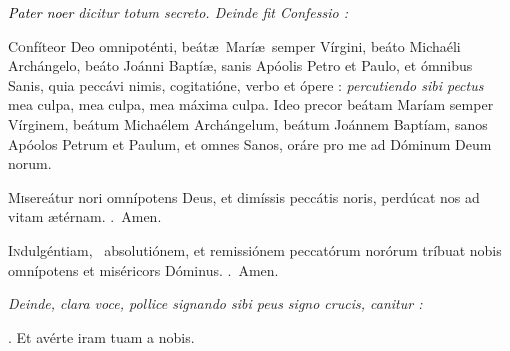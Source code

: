 \documentclass[12pt]{article} %
\def\noinitial{%
\setspaceafterinitial{0pt plus 0em minus 0em}%
\setspacebeforeinitial{0pt plus 0em minus 0em}%
\relax %
}
\newenvironment{rubric}{\color{benred8} \itshape \leftskip 0in \setlength{\parindent}{0.25in}}{\vspace{2 mm}}
\newenvironment{response}{\leftskip 0in \setlength{\parindent}{0in}}{\vspace{2 mm}}
\let\oldRbar\Rbar
\renewcommand{\Rbar}{\textcolor{benred8}{\oldRbar .}}
\let\oldgrealtcross\grealtcross
\renewcommand{\grealtcross}{\textcolor{benred8}{\oldgrealtcross}}
\begin{document}
\vspace{1.5mm}

\begin{rubric}
\emph{\textcolor{black}{Pater noer}} dicitur totum secreto. Deinde fit Confessio :

\end{rubric}

\begin{response}\lettrine{C}{o}nf\'{i}teor Deo omnipot\'{e}nti, be\'{a}t\ae\ Mar\'{i}\ae\ semper V\'{i}rgini, be\'{a}to Micha\'{e}li Arch\'{a}ngelo, be\'{a}to Jo\'{a}nni Bapt\'{i}\ae , sanis Ap\'{o}olis Petro et Paulo, et \'{o}mnibus Sanis, quia pecc\'{a}vi nimis, cogitati\'{o}ne, verbo et \'{o}pere : \emph{\textcolor{benred8}{percutiendo sibi pectus}} mea culpa, mea culpa, mea m\'{a}xima culpa. Ideo precor be\'{a}tam Mar\'{i}am semper V\'{i}rginem, be\'{a}tum Micha\'{e}lem Arch\'{a}ngelum, be\'{a}tum Jo\'{a}nnem Bapt\'{i}am, sanos Ap\'{o}olos Petrum et Paulum, et omnes Sanos, or\'{a}re pro me ad D\'{o}minum Deum norum.

\end{response}

\begin{response}\lettrine{M}{i}sere\'{a}tur nori omn\'{i}potens Deus, et dim\'{i}ssis pecc\'{a}tis noris, perd\'{u}cat nos ad vitam \ae t\'{e}rnam. \Rbar\ Amen.

\end{response}

\begin{response}\lettrine{I}{n}dulg\'{e}ntiam, \grealtcross\ absoluti\'{o}nem, et remissi\'{o}nem peccat\'{o}rum nor\'{o}rum tr\'{i}buat nobis omn\'{i}potens et mis\'{e}ricors D\'{o}minus. \Rbar\ Amen.

\end{response}

\begin{rubric}
Deinde, clara voce, pollice signando sibi peus signo crucis, canitur :

\end{rubric}

{\noinitial
{}

}

\begin{response}
\hspace{1.0 mm}\Rbar\hspace{0.3mm} Et \hspace{7.5mm} av\'{e}rte \hspace{6.7mm} iram \hspace{6.5mm} tuam \hspace{0.3mm} a \hspace{1.0mm} nobis.

\end{response}
\end{document}
